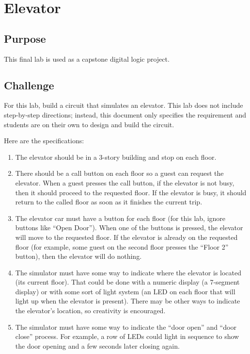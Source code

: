 \chapter{Elevator}

\section{Purpose}

This final lab is used as a capstone digital logic project. 

\section{Challenge}

For this lab, build a circuit that simulates an elevator. This lab does not include step-by-step directions; instead, this document only specifies the requirement and students are on their own to design and build the circuit.

Here are the specifications:

\begin{enumerate}
	\item The elevator should be in a 3-story building and stop on each floor.
	\item There should be a call button on each floor so a guest can request the elevator. When a guest presses the call button, if the elevator is not busy, then it should proceed to the requested floor. If the elevator is busy, it should return to the called floor as soon as it finishes the current trip.
	\item The elevator car must have a button for each floor (for this lab, ignore buttons like ``Open Door''). When one of the buttons is pressed, the elevator will move to the requested floor. If the elevator is already on the requested floor (for example, some guest on the second floor presses the ``Floor 2'' button), then the elevator will do nothing.
	\item The simulator must have some way to indicate where the elevator is located (its current floor). That could be done with a numeric display (a 7-segment display) or with some sort of light system (an LED on each floor that will light up when the elevator is present). There may be other ways to indicate the elevator's location, so creativity is encouraged.
	\item The simulator must have some way to indicate the ``door open'' and ``door close'' process. For example, a row of LEDs could light in sequence to show the door opening and a few seconds later closing again.
\end{enumerate}

